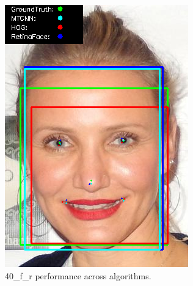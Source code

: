 \documentclass{l4proj}
\begin{document}
\begin{appendices}
\begin{figure}[h!]
  \centering
  \begin{minipage}{0.49\textwidth}
    \centering
     \includegraphics[width=\textwidth]{images/appendix/40.png}
    \caption{40\_f\_r performance across algorithms.}
    \label{whoopi_result}
  \end{minipage}
    \hfill
    \begin{minipage}{0.49\textwidth}
    \centering

\end{minipage}
\end{figure}
\end{appendices}
\end{document}
